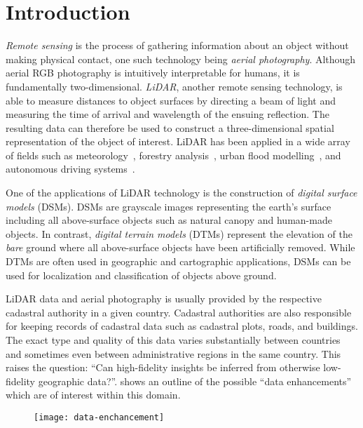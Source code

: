 \chapter{Introduction}%
\label{sec:introduction}

\textit{Remote sensing} is the process of gathering information about an object without making physical contact, one such technology being \textit{aerial photography}.
Although aerial RGB photography is intuitively interpretable for humans, it is fundamentally two-dimensional.
\textit{LiDAR}, another remote sensing technology, is able to measure distances to object surfaces by directing a beam of light and measuring the time of arrival and wavelength of the ensuing reflection.
The resulting data can therefore be used to construct a three-dimensional spatial representation of the object of interest.
LiDAR has been applied in a wide array of fields such as meteorology~\cite{lidar_meteorology_1966}, forestry analysis~\cite{lidar_forestry_2000}, urban flood modelling~\cite{lidar_flood_2013}, and autonomous driving systems~\cite{lidar_self_driving_2018}.

One of the applications of LiDAR technology is the construction of \textit{digital surface models} (DSMs).
DSMs are grayscale images representing the earth's surface including all above-surface objects such as natural canopy and human-made objects.
In contrast, \textit{digital terrain models} (DTMs) represent the elevation of the \textit{bare} ground where all above-surface objects have been artificially removed.
While DTMs are often used in geographic and cartographic applications, DSMs can be used for localization and classification of objects above ground.

LiDAR data and aerial photography is usually provided by the respective cadastral authority in a given country.
Cadastral authorities are also responsible for keeping records of cadastral data such as cadastral plots, roads, and buildings.
The exact type and quality of this data varies substantially between countries and sometimes even between administrative regions in the same country.
This raises the question: \enquote{Can high-fidelity insights be inferred from otherwise low-fidelity geographic data?}.
 shows an outline of the possible \enquote{data enhancements} which are of interest within this domain. %

\begin{figure}
  \texttt{[image: data-enchancement]}
  \label{fig:data-enchancement}
\end{figure}

